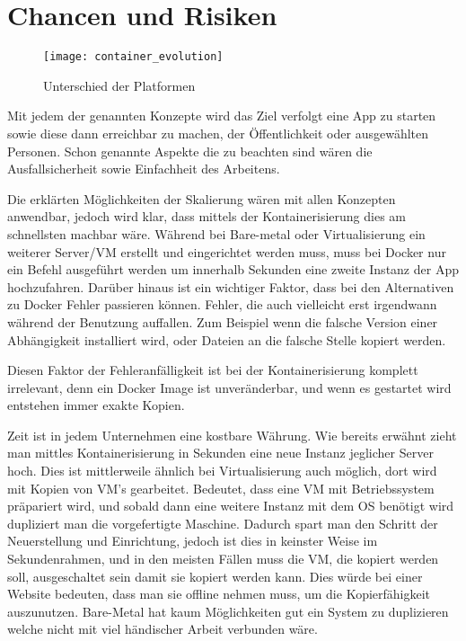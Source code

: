 \newpage
\section{Chancen und Risiken}

\begin{figure}[H]
\caption{Unterschied der Platformen}
\texttt{[image: container\_evolution]}
\\
\cite[][27.03.2020]{Quelle: https://bit.ly/32EnzVe}
\end{figure}

Mit jedem der genannten Konzepte wird das Ziel verfolgt eine App zu starten sowie diese dann erreichbar zu machen, der Öffentlichkeit oder ausgewählten Personen.
Schon genannte Aspekte die zu beachten sind wären die Ausfallsicherheit sowie Einfachheit des Arbeitens.

Die erklärten Möglichkeiten der Skalierung wären mit allen Konzepten anwendbar, jedoch wird klar, dass mittels der Kontainerisierung dies am schnellsten machbar wäre.
Während bei Bare-metal oder Virtualisierung ein weiterer Server/VM erstellt und eingerichtet werden muss, muss bei Docker nur ein Befehl ausgeführt werden um innerhalb Sekunden eine zweite 
Instanz der App hochzufahren.
Darüber hinaus ist ein wichtiger Faktor, dass bei den Alternativen zu Docker Fehler passieren können. Fehler, die auch vielleicht erst irgendwann während der Benutzung auffallen.
Zum Beispiel wenn die falsche Version einer Abhängigkeit installiert wird, oder Dateien an die falsche Stelle kopiert werden.

Diesen Faktor der Fehleranfälligkeit ist bei der Kontainerisierung komplett irrelevant, denn ein Docker Image ist unveränderbar, und wenn es gestartet wird 
entstehen immer exakte Kopien.

Zeit ist in jedem Unternehmen eine kostbare Währung. Wie bereits erwähnt zieht man mittles Kontainerisierung in Sekunden eine neue Instanz jeglicher Server hoch.
Dies ist mittlerweile ähnlich bei Virtualisierung auch möglich, dort wird mit Kopien von VM's gearbeitet. Bedeutet, dass eine VM mit Betriebssystem präpariert wird, und
sobald dann eine weitere Instanz mit dem OS benötigt wird dupliziert man die vorgefertigte Maschine. Dadurch spart man den Schritt der Neuerstellung und Einrichtung, jedoch
ist dies in keinster Weise im Sekundenrahmen, und in den meisten Fällen muss die VM, die kopiert werden soll, ausgeschaltet sein damit sie kopiert werden kann. 
Dies würde bei einer Website bedeuten, dass man sie offline nehmen muss, um die Kopierfähigkeit auszunutzen.
Bare-Metal hat kaum Möglichkeiten gut ein System zu duplizieren welche nicht mit viel händischer Arbeit verbunden wäre.

